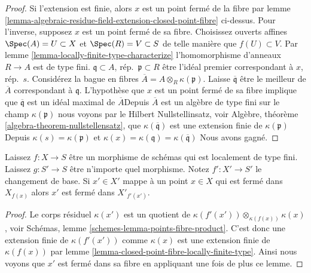\begin{proof}

Si l'extension est finie, alors $x$ est un point fermé de la fibre par lemme \ref{lemma-algebraic-residue-field-extension-closed-point-fibre}
ci-dessus. Pour l'inverse, supposez $x$ est un point fermé de sa fibre. Choisissez ouverts affines $\Spec(A) = U \subset X$
et $\Spec(R) = V \subset S$ de telle manière que $f(U) \subset V$. Par lemme \ref{lemma-locally-finite-type-characterize} l'homomorphisme d'anneaux
$R \to A$ est de type fini. $\mathfrak q \subset A$, rép.\ $\mathfrak p \subset R$ être l'idéal premier correspondant à $x$, rép.\ $s$. Considérez la bague en fibres
$\overline{A} = A \otimes_R \kappa(\mathfrak p)$. Laisse $\overline{\mathfrak q}$ être le meilleur de $\overline{A}$
correspondant à $\mathfrak q$. L'hypothèse que $x$
est un point fermé de sa fibre implique que $\overline{\mathfrak q}$
est un idéal maximal de $\overline{A}$Depuis $\overline{A}$
est un algèbre de type fini sur le champ $\kappa(\mathfrak p)$
nous voyons par le Hilbert Nullstellinsatz, voir Algèbre, théorème \ref{algebra-theorem-nullstellensatz}, que $\kappa(\overline{\mathfrak q})$ est une extension finie de $\kappa(\mathfrak p)$Depuis $\kappa(s) = \kappa(\mathfrak p)$ et
$\kappa(x) = \kappa(\mathfrak q) = \kappa(\overline{\mathfrak q})$
Nous avons gagné.

\end{proof}

\begin{lemma}

\label{lemma-base-change-closed-point-fibre-locally-finite-type}
Laissez $f : X \to S$ être un morphisme de schémas qui est localement de type fini. Laissez $g : S' \to S$ être n'importe quel morphisme. Notez $f' : X' \to S'$ le changement de base. Si $x' \in X'$ mappe à un point $x \in X$ qui est fermé dans $X_{f(x)}$ alors $x'$ est fermé dans $X'_{f'(x')}$.
\end{lemma}

\begin{proof}

Le corps résiduel $\kappa(x')$ est un quotient de
$\kappa(f'(x')) \otimes_{\kappa(f(x))} \kappa(x)$, voir Schémas, lemme \ref{schemes-lemma-points-fibre-product}. C'est donc une extension finie de $\kappa(f'(x'))$ comme
$\kappa(x)$ est une extension finie de $\kappa(f(x))$ par lemme \ref{lemma-closed-point-fibre-locally-finite-type}. Ainsi nous voyons que $x'$ est fermé dans sa fibre en appliquant une fois de plus ce lemme.

\end{proof}

